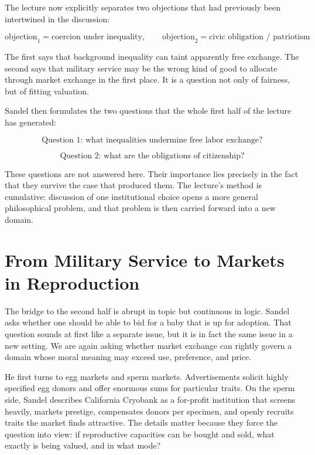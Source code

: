 The lecture now explicitly separates two objections that had previously been intertwined in the discussion:

\begin{equation}
\text{objection}_1=\text{coercion under inequality},
\qquad
\text{objection}_2=\text{civic obligation / patriotism}
\end{equation}

The first says that background inequality can taint apparently free exchange. The second says that military service may be the wrong kind of good to allocate through market exchange in the first place. It is a question not only of fairness, but of fitting valuation.

Sandel then formulates the two questions that the whole first half of the lecture has generated:

\begin{equation}
\text{Question 1: what inequalities undermine free labor exchange?}
\end{equation}

\begin{equation}
\text{Question 2: what are the obligations of citizenship?}
\end{equation}

These questions are not answered here. Their importance lies precisely in the fact that they survive the case that produced them. The lecture's method is cumulative: discussion of one institutional choice opens a more general philosophical problem, and that problem is then carried forward into a new domain.

\section{From Military Service to Markets in Reproduction}

The bridge to the second half is abrupt in topic but continuous in logic. Sandel asks whether one should be able to bid for a baby that is up for adoption. That question sounds at first like a separate issue, but it is in fact the same issue in a new setting. We are again asking whether market exchange can rightly govern a domain whose moral meaning may exceed use, preference, and price.

He first turns to egg markets and sperm markets. Advertisements solicit highly specified egg donors and offer enormous sums for particular traits. On the sperm side, Sandel describes California Cryobank as a for-profit institution that screens heavily, markets prestige, compensates donors per specimen, and openly recruits traits the market finds attractive. The details matter because they force the question into view: if reproductive capacities can be bought and sold, what exactly is being valued, and in what mode?

